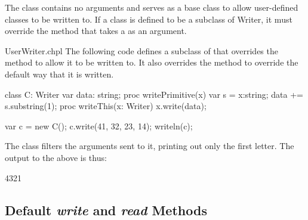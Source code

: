 The  class contains no arguments and serves as a base
class to allow user-defined classes to be written to.  If a class is
defined to be a subclass of Writer, it must override
the  method that takes a  as an argument.

\begin{chapelexample}{UserWriter.chpl}
The following code defines a subclass of  that overrides
the  method to allow it to be written to.  It also
overrides the  method to override the default way that
it is written.
\begin{chapel}
class C: Writer {
  var data: string;
  proc writePrimitive(x) {
    var s = x:string;
    data += s.substring(1);
  }
  proc writeThis(x: Writer) {
    x.write(data);
  }
}

var c = new C();
c.write(41, 32, 23, 14);
writeln(c);
\end{chapel}
The  class filters the arguments sent to it, printing out only
the first letter.  The output to the above is thus:
\begin{chapelprintoutput}{}
4321
\end{chapelprintoutput}
\end{chapelexample}






\subsection{Default {\em write} and {\em read} Methods}



